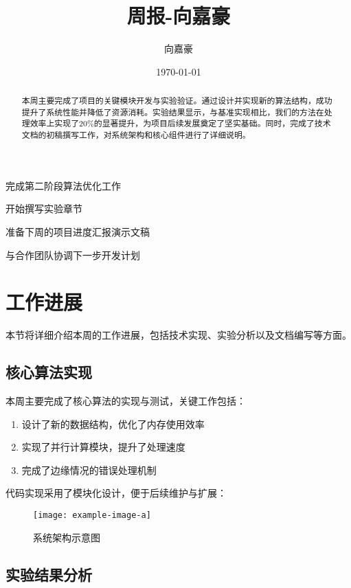 \documentclass{article}
\title{周报-向嘉豪}
\author{向嘉豪}
\date{\today}
\begin{document}
\maketitle

\begin{abstract}
  本周主要完成了项目的关键模块开发与实验验证。通过设计并实现新的算法结构，成功提升了系统性能并降低了资源消耗。实验结果显示，与基准实现相比，我们的方法在处理效率上实现了20\%的显著提升，为项目后续发展奠定了坚实基础。同时，完成了技术文档的初稿撰写工作，对系统架构和核心组件进行了详细说明。
\end{abstract}

\begin{weekplan}
\item 完成第二阶段算法优化工作
\item 开始撰写实验章节
\item 准备下周的项目进度汇报演示文稿
\item 与合作团队协调下一步开发计划
\end{weekplan}

\section{工作进展}

本节将详细介绍本周的工作进展，包括技术实现、实验分析以及文档编写等方面。

\subsection{核心算法实现}

本周主要完成了核心算法的实现与测试，关键工作包括：

\begin{enumerate}
  \item 设计了新的数据结构，优化了内存使用效率
  \item 实现了并行计算模块，提升了处理速度
  \item 完成了边缘情况的错误处理机制
\end{enumerate}

代码实现采用了模块化设计，便于后续维护与扩展：

\begin{figure}[h]
  \centering
  \texttt{[image: example-image-a]}
  \caption{系统架构示意图}
  \label{fig:system_architecture}
\end{figure}

\subsection{实验结果分析}
\end{document}
